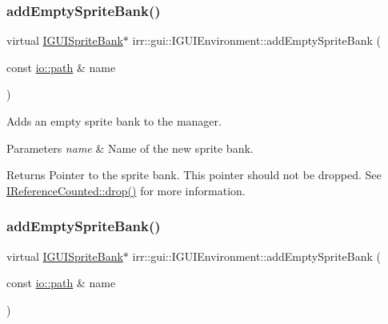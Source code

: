 \subsubsection{\texorpdfstring{add\+Empty\+Sprite\+Bank()}{addEmptySpriteBank()}\hspace{0.1cm}{\footnotesize\ttfamily [1/2]}}
{\footnotesize\ttfamily virtual \hyperlink{classirr_1_1gui_1_1IGUISpriteBank}{I\+G\+U\+I\+Sprite\+Bank}$\ast$ irr\+::gui\+::\+I\+G\+U\+I\+Environment\+::add\+Empty\+Sprite\+Bank (\begin{DoxyParamCaption}\item[{const \hyperlink{namespaceirr_1_1io_a6468281622ce3a1c46b72e19f32dded5}{io\+::path} \&}]{name }\end{DoxyParamCaption})\hspace{0.3cm}{\ttfamily [pure virtual]}}



Adds an empty sprite bank to the manager. 


\begin{DoxyParams}{Parameters}
{\em name} & Name of the new sprite bank. \\
\hline
\end{DoxyParams}
\begin{DoxyReturn}{Returns}
Pointer to the sprite bank. This pointer should not be dropped. See \hyperlink{classirr_1_1IReferenceCounted_a03856a09355b89d178090c4a5f738543}{I\+Reference\+Counted\+::drop()} for more information. 
\end{DoxyReturn}
\mbox{\label{classirr_1_1gui_1_1IGUIEnvironment_a62f34cdf4dd600a35eaf37d856579d98}} 
\subsubsection{\texorpdfstring{add\+Empty\+Sprite\+Bank()}{addEmptySpriteBank()}\hspace{0.1cm}{\footnotesize\ttfamily [2/2]}}
{\footnotesize\ttfamily virtual \hyperlink{classirr_1_1gui_1_1IGUISpriteBank}{I\+G\+U\+I\+Sprite\+Bank}$\ast$ irr\+::gui\+::\+I\+G\+U\+I\+Environment\+::add\+Empty\+Sprite\+Bank (\begin{DoxyParamCaption}\item[{const \hyperlink{namespaceirr_1_1io_a6468281622ce3a1c46b72e19f32dded5}{io\+::path} \&}]{name }\end{DoxyParamCaption})\hspace{0.3cm}{\ttfamily [pure virtual]}}




